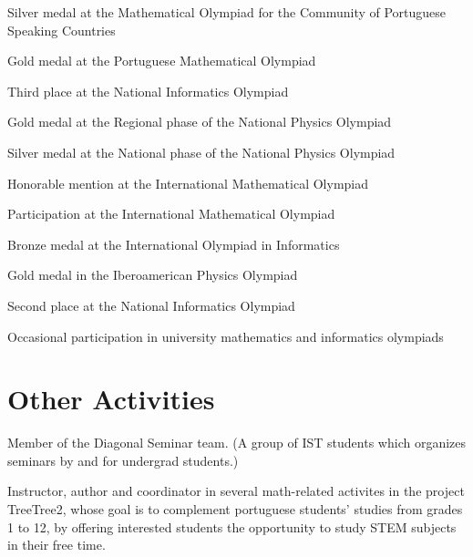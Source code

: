 \documentclass[11pt]{article} %
\begin{document}
\entry Silver medal at the Mathematical Olympiad for the Community of Portuguese Speaking Countries
\smallskip

 \entry Gold medal at the Portuguese Mathematical Olympiad
\smallskip

\entry Third place at the National Informatics Olympiad
\smallskip

\entry Gold medal at the Regional phase of the National Physics Olympiad
\smallskip

\entry Silver medal at the National phase of the National Physics Olympiad
\smallskip

\entry Honorable mention at the International Mathematical Olympiad
\smallskip

 \entry Participation at the International Mathematical Olympiad
\smallskip

\entry Bronze medal at the International Olympiad in Informatics
\smallskip

\entry Gold medal in the Iberoamerican Physics Olympiad
\smallskip

\entry Second place at the National Informatics Olympiad
\smallskip

 \entry Occasional participation in university mathematics and informatics olympiads

\section*{Other Activities}

 \entry Member of the Diagonal Seminar team. (A group of IST students which organizes seminars by and for undergrad students.)

 \entry Instructor, author and coordinator in several math-related activites in the project TreeTree2, whose goal is to complement portuguese students' studies from grades 1 to 12, by offering interested students the opportunity to study STEM subjects in their free time.




%
%
\end{document}
